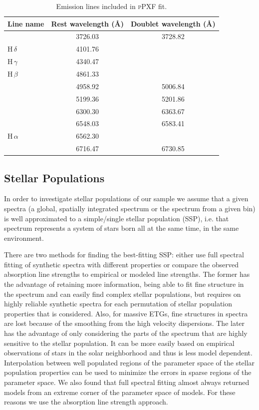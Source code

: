 	 	\begin{table}
	 		\centering
	 	\begin{threeparttable}
	 		\caption{Emission lines included in \textsc{pPXF} fit.}
	 		\label{tab:EmissionLine}
	 		\begin{tabular}{l c c}
	 		\hline
	 		\hline
	 		Line name 		& Rest wavelength (\AA) & Doublet wavelength (\AA) \\
	 		\hline
	 		[\ion{O}{ii}] 	& 3726.03 & 3728.82 \\
	 		H\,$\delta$ 		& 4101.76 & \\
	 		H\,$\gamma$ 		& 4340.47 & \\
	 		H\,$\beta$ 		& 4861.33 & \\
	 		[\ion{O}{iii}] 	& 4958.92 & 5006.84 \\
	 		[\ion{N}{i}] 	& 5199.36 & 5201.86 \\
	 		[\ion{O}{i}] 	& 6300.30 & 6363.67 \\
	 		[\ion{N}{ii}] 	& 6548.03 & 6583.41 \\
	 		H\,$\alpha$ 		& 6562.30 &\\
	 		[\ion{S}{ii}] 	& 6716.47 & 6730.85 \\
	 		\hline
	 		\hline
	 		\end{tabular}
	 	\end{threeparttable}
	 	\end{table}




	 \subsection{Stellar Populations}
	 	\label{subsec:PopFit}
	 	In order to investigate stellar populations of our sample we assume that a given spectra (a global, spatially integrated spectrum or the spectrum from a given bin) is well approximated to a simple/single stellar population (SSP), i.e. that spectrum represents a system of stars born all at the same time, in the same environment. 

	 	There are two methods for finding the best-fitting SSP: either use full spectral fitting of synthetic spectra with different properties or compare the observed absorption line strengths to empirical or modeled line strengths. The former has the advantage of retaining more information, being able to fit fine structure in the spectrum and can easily find complex stellar populations, but requires on highly reliable synthetic spectra for each permutation of stellar population properties that is considered. Also, for massive ETGs, fine structures in spectra are lost because of the smoothing from the high velocity dispersions. The later has the advantage of only considering the parts of the spectrum that are highly sensitive to the stellar population. It can be more easily based on empirical observations of stars in the solar neighborhood and thus is less model dependent. Interpolation between well populated regions of the parameter space of the stellar population properties can be used to minimize the errors in sparse regions of the parameter space. We also found that full spectral fitting almost always returned models from an extreme corner of the parameter space of models. For these reasons we use the absorption line strength approach.

